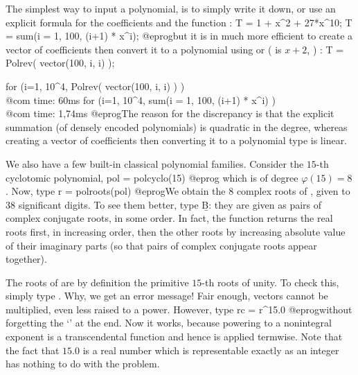 The simplest way to input a polynomial, is to simply write it down,
or use an explicit formula for the coefficients and the function :
\bprog
  T = 1 + x^2 + 27*x^10;
  T = sum(i = 1, 100, (i+1) * x^i);
@eprog\noindent but it is in much more efficient to create a vector of
coefficients then convert it to a polynomial using  or 
( is $x+2$, ) :
\bprog
  T = Polrev( vector(100, i, i) );

  for (i=1, 10^4, Polrev( vector(100, i, i) ) )   \\@com time: 60ms
  for (i=1, 10^4, sum(i = 1, 100, (i+1) * x^i) ) \\@com time: 1,74ms
@eprog\noindent The reason for the discrepancy is that the explicit summation
(of densely encoded polynomials) is quadratic in the degree, whereas creating
a vector of coefficients then converting it to a polynomial type is linear.

We also have a few built-in classical polynomial families. Consider the
$15$-th cyclotomic polynomial,
\bprog
  pol = polcyclo(15)
@eprog\noindent
which is of degree $\varphi(15)=8$. Now, type
\bprog
  r = polroots(pol)
@eprog\noindent We obtain the 8 complex roots of , given to 38
significant digits. To see them better, type \b{B}: they are given as pairs
of complex conjugate roots, in some order. In fact, the
function  returns the real roots first, in increasing order,
then the other roots by increasing absolute value of their imaginary parts
(so that pairs of complex conjugate roots appear together).

The roots of  are by definition the primitive $15$-th roots of unity.
To check this, simply type . Why, we get an error message!
Fair enough, vectors cannot be multiplied, even less raised to a power.
However, type
\bprog
  rc = r^15.0
@eprog\noindent without forgetting the `' at the end. Now it works,
because powering to a nonintegral exponent is a transcendental function and
hence is applied termwise. Note that the fact that $15.0$ is a real number
which is representable exactly as an integer has nothing to do with the
problem.

